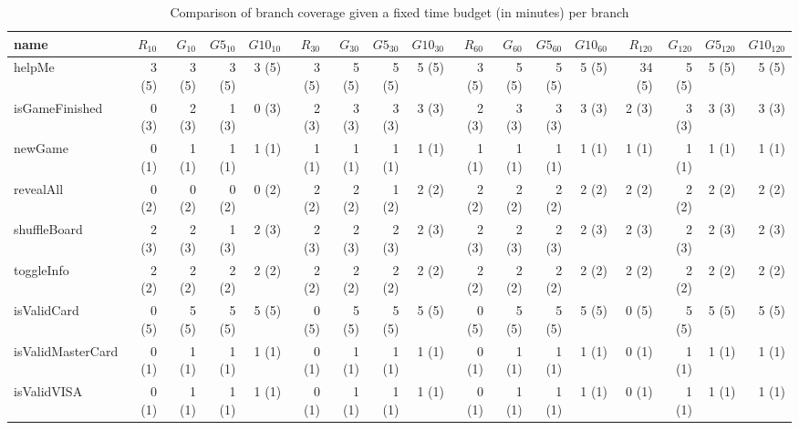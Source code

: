 \begin{table*}
  \caption{Comparison of branch coverage given a fixed time budget (in minutes) per branch}
  \label{tbl.stats.branch.coverage}
    \tiny
    \begin{tabular}{l|rrrr|rrrr|rrrr|rrrr}
      \toprule
      \textbf{name}   & $R_{10}$ & $G_{10}$ & $G5_{10}$ & $G10_{10}$ & $R_{30}$ & $G_{30}$ & $G5_{30}$ & $G10_{30}$ & $R_{60}$ & $G_{60}$ & $G5_{60}$ & $G10_{60}$ & $R_{120}$ & $G_{120}$ & $G5_{120}$ & $G10_{120}$ \\
      \toprule
      helpMe          & 3 (5)   & 3 (5)   & 3 (5)    & 3 (5)     & 3 (5)   & 5 (5)   & 5 (5)    & 5 (5)     & 3 (5)   & 5 (5)   & 5 (5)    & 5 (5)     &  34 (5)  & 5 (5)   & 5 (5)     & 5 (5) \\
      isGameFinished  & 0 (3)   & 2 (3)   & 1 (3)    & 0 (3)     & 2 (3)   & 3 (3)   & 3 (3)    & 3 (3)     & 2 (3)   & 3 (3)   & 3 (3)    & 3 (3)     &  2 (3)   & 3 (3)   & 3 (3)     & 3 (3) \\
      newGame         & 0 (1)   & 1 (1)   & 1 (1)    & 1 (1)     & 1 (1)   & 1 (1)   & 1 (1)    & 1 (1)     & 1 (1)   & 1 (1)   & 1 (1)    & 1 (1)     & 1 (1)    & 1 (1)   & 1 (1)     & 1 (1) \\
      revealAll       & 0 (2)   & 0 (2)   & 0 (2)    & 0 (2)     & 2 (2)   & 2 (2)   & 1 (2)    & 2 (2)     & 2 (2)   & 2 (2)   & 2 (2)    & 2 (2)     &  2 (2)   & 2 (2)   & 2 (2)     & 2 (2) \\
      shuffleBoard    & 2 (3)   & 2 (3)   & 1 (3)    & 2 (3)     & 2 (3)   & 2 (3)   & 2 (3)    & 2 (3)     & 2 (3)   & 2 (3)   & 2 (3)    & 2 (3)     &  2 (3)   & 2 (3)   & 2 (3)     & 2 (3) \\
      \midrule
      toggleInfo      & 2 (2)   & 2 (2)   & 2 (2)    & 2 (2)     & 2 (2)   & 2 (2)   & 2 (2)    & 2 (2)     & 2 (2)   & 2 (2)   & 2 (2)    & 2 (2)     & 2 (2)    & 2 (2)   & 2 (2)     & 2 (2) \\
      \midrule
      isValidCard     & 0 (5)   & 5 (5)   & 5 (5)    & 5 (5)     & 0 (5)   & 5 (5)   & 5 (5)    & 5 (5)     & 0 (5)   & 5 (5)   & 5 (5)    & 5 (5)     & 0 (5)    & 5 (5)   & 5 (5)     & 5 (5) \\
   isValidMasterCard  & 0 (1)   & 1 (1)   & 1 (1)    & 1 (1)     & 0 (1)   & 1 (1)   & 1 (1)    & 1 (1)     & 0 (1)   & 1 (1)   & 1 (1)    & 1 (1)     & 0 (1)    & 1 (1)   & 1 (1)     & 1 (1) \\
      isValidVISA     & 0 (1)   & 1 (1)   & 1 (1)    & 1 (1)     & 0 (1)   & 1 (1)   & 1 (1)    & 1 (1)     & 0 (1)   & 1 (1)   & 1 (1)    & 1 (1)     & 0 (1)    & 1 (1)   & 1 (1)     & 1 (1) \\

\end{tabular}
\end{table*}
